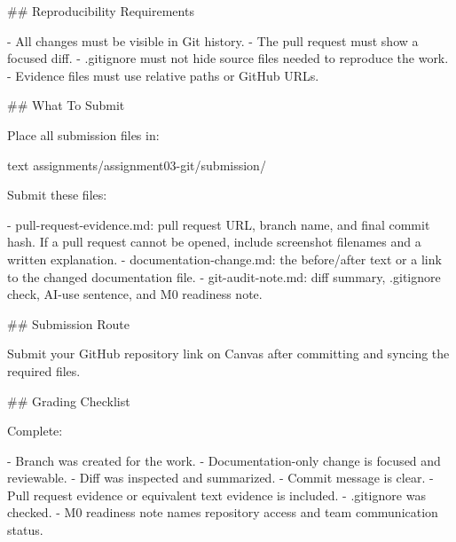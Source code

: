\documentclass[
  letterpaper,
  DIV=11,
  numbers=noendperiod,
  oneside]{scrreprt}
\newenvironment{Shaded}{\begin{snugshade}}{\end{snugshade}}
\newcommand{\FunctionTok}[1]{\textcolor[rgb]{0.28,0.35,0.67}{#1}}
\newcommand{\InformationTok}[1]{\textcolor[rgb]{0.37,0.37,0.37}{#1}}
\newcommand{\NormalTok}[1]{\textcolor[rgb]{0.00,0.23,0.31}{#1}}
\newcommand{\SpecialStringTok}[1]{\textcolor[rgb]{0.13,0.47,0.30}{#1}}
\begin{document}
\begin{Shaded}
\begin{Highlighting}[numbers=left,,]
\FunctionTok{\#\# Reproducibility Requirements}

\SpecialStringTok{{-} }\NormalTok{All changes must be visible in Git history.}
\SpecialStringTok{{-} }\NormalTok{The pull request must show a focused diff.}
\SpecialStringTok{{-} }\InformationTok{\textasciigrave{}.gitignore\textasciigrave{}}\NormalTok{ must not hide source files needed to reproduce the work.}
\SpecialStringTok{{-} }\NormalTok{Evidence files must use relative paths or GitHub URLs.}

\FunctionTok{\#\# What To Submit}

\NormalTok{Place all submission files in:}

\InformationTok{\textasciigrave{}\textasciigrave{}\textasciigrave{}text}
\InformationTok{assignments/assignment03{-}git/submission/}
\InformationTok{\textasciigrave{}\textasciigrave{}\textasciigrave{}}

\NormalTok{Submit these files:}

\SpecialStringTok{{-} }\InformationTok{\textasciigrave{}pull{-}request{-}evidence.md\textasciigrave{}}\NormalTok{: pull request URL, branch name, and final commit hash. If a pull request cannot be opened, include screenshot filenames and a written explanation.}
\SpecialStringTok{{-} }\InformationTok{\textasciigrave{}documentation{-}change.md\textasciigrave{}}\NormalTok{: the before/after text or a link to the changed documentation file.}
\SpecialStringTok{{-} }\InformationTok{\textasciigrave{}git{-}audit{-}note.md\textasciigrave{}}\NormalTok{: diff summary, }\InformationTok{\textasciigrave{}.gitignore\textasciigrave{}}\NormalTok{ check, AI{-}use sentence, and M0 readiness note.}

\FunctionTok{\#\# Submission Route}

\NormalTok{Submit your GitHub repository link on Canvas after committing and syncing the required files.}

\FunctionTok{\#\# Grading Checklist}

\NormalTok{Complete:}

\SpecialStringTok{{-} }\NormalTok{Branch was created for the work.}
\SpecialStringTok{{-} }\NormalTok{Documentation{-}only change is focused and reviewable.}
\SpecialStringTok{{-} }\NormalTok{Diff was inspected and summarized.}
\SpecialStringTok{{-} }\NormalTok{Commit message is clear.}
\SpecialStringTok{{-} }\NormalTok{Pull request evidence or equivalent text evidence is included.}
\SpecialStringTok{{-} }\InformationTok{\textasciigrave{}.gitignore\textasciigrave{}}\NormalTok{ was checked.}
\SpecialStringTok{{-} }\NormalTok{M0 readiness note names repository access and team communication status.}


\end{Highlighting}
\end{Shaded}
\end{document}
